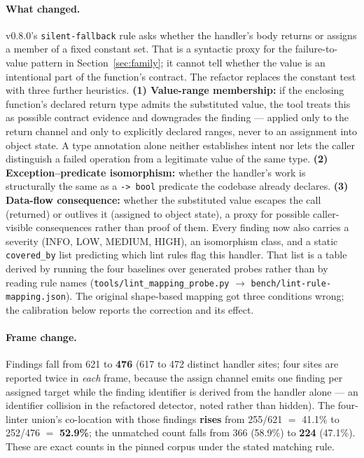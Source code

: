 \documentclass[10pt,a4paper]{article}
\begin{document}
\paragraph{What changed.} v0.8.0's \texttt{silent-fallback} rule asks whether the
handler's body returns or assigns a member of a fixed constant set. That is a
syntactic proxy for the failure-to-value pattern in
Section~\ref{sec:family}; it cannot tell whether the value is an intentional
part of the function's contract. The refactor replaces the constant test with
three further heuristics. \textbf{(1) Value-range membership:}
if the enclosing function's declared return type admits the substituted value,
the tool treats this as possible contract evidence and downgrades the finding ---
applied only to the return channel and only to explicitly declared ranges, never to
an assignment into object state. A type annotation alone neither establishes
intent nor lets the caller distinguish a failed operation from a legitimate
value of the same type. \textbf{(2) Exception--predicate isomorphism:}
whether the handler's work is structurally the same as a \texttt{-> bool} predicate
the codebase already declares. \textbf{(3) Data-flow consequence:} whether the
substituted value escapes the call (returned) or outlives it (assigned to object
state), a proxy for possible caller-visible consequences rather than proof of
them. Every finding now also
carries a severity (INFO, LOW, MEDIUM, HIGH), an isomorphism class, and a static
\texttt{covered\_by} list predicting which lint rules flag this handler. That
list is a table derived by running the four baselines over generated probes rather than
by reading rule names
(\texttt{tools/lint\_mapping\_probe.py} $\rightarrow$
\texttt{bench/lint-rule-mapping.json}). The original shape-based mapping got
three conditions wrong; the calibration below reports the correction and its effect.

\paragraph{Frame change.}
Findings fall from 621 to \textbf{476} (617 to 472 distinct handler sites; four
sites are reported twice in \emph{each} frame, because the assign channel emits one
finding per assigned target while the finding identifier is derived from the handler
alone --- an identifier collision in the refactored detector, noted rather than
hidden). The four-linter union's co-location with those findings \textbf{rises}
from 255/621 $=$ 41.1\% to 252/476 $=$ \textbf{52.9\%}; the unmatched count
falls from 366 (58.9\%) to \textbf{224} (47.1\%). These are exact counts in the
pinned corpus under the stated matching rule.
\end{document}
